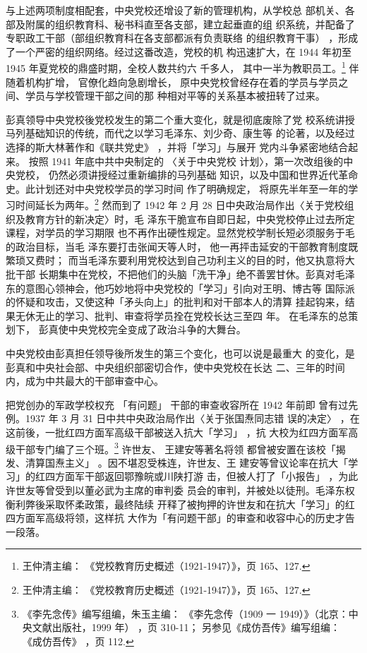 与上述两项制度相配套，中央党校还增设了新的管理机构，从学校总
部机关、各部及附属的组织教育科、秘书科直至各支部，建立起垂直的组
织系统，并配备了专职政工干部（部组织教育科在各支部都派有负责联络
的组织教育干事）
，形成了一个严密的组织网络。经过这番改造，党校的机
构迅速扩大，在 1944 年初至 1945 年夏党校的鼎盛时期，全校人数共约六
千多人，
其中一半为教职员工。\footnote{王仲清主编：
《党校教育历史概述（1921-1947）》，页 165、127.} 伴随着机构扩增，
官僚化趋向急剧增长，
原中央党校曾经存在着的学员与学员之间、学员与学校管理干部之间的那
种相对平等的关系基本被扭转了过来。

彭真领导中央党校後党校发生的第二个重大变化，就是彻底废除了党
校系统讲授马列基础知识的传统，而代之以学习毛泽东、刘少奇、康生等
的论著，以及经过选择的斯大林著作和《联共党史》
，并将「学习」与展开
党内斗争紧密地结合起来。
按照 1941 年底中共中央制定的
〈关于中央党校
计划〉，第一次改组後的中央党校，
仍然必须讲授经过重新编排的马列基础
知识，以及中国和世界近代革命史。此计划还对中央党校学员的学习时间
作了明确规定，
将原先半年至一年的学习时间延长为两年。\footnote{王仲清主编：
《党校教育历史概述（1921-1947）》，页 165、127.} 然而到了 1942
年 2 月 28 日中央政治局作出〈关于党校组织及教育方针的新决定〉时，毛
泽东干脆宣布自即日起，中央党校停止过去所定课程，对学员的学习期限
也不再作出硬性规定。显然党校学制长短必须服务于毛的政治目标，当毛
泽东要打击张闻天等人时，
他一再抨击延安的干部教育制度既繁琐又费时；
而当毛泽东要利用党校达到自己功利主义的目的时，他又执意将大批干部
长期集中在党校，不把他们的头脑「洗干净」绝不善罢甘休。彭真对毛泽
东的意图心领神会，他巧妙地将中央党校的「学习」引向对王明、博古等
国际派的怀疑和攻击，又使这种「矛头向上」的批判和对干部本人的清算
挂起钩来，结果无休无止的学习、批判、审查将学员拴在党校长达三至四
年。
在毛泽东的总策划下，
彭真使中央党校完全变成了政治斗争的大舞台。

中央党校由彭真担任领导後所发生的第三个变化，也可以说是最重大
的变化，是彭真和中央社会部、中央组织部密切合作，使中央党校在长达
二、三年的时间内，成为中共最大的干部审查中心。

把党创办的军政学校权充
「有问题」
干部的审查收容所在 1942 年前即
曾有过先例。1937 年 3 月 31 日中共中央政治局作出〈关于张国焘同志错
误的决定〉
，在这前後，一批红四方面军高级干部被送入抗大「学习」
，抗
大校为红四方面军高级干部专门编了三个班。\footnote{《李先念传》编写组编，朱玉主编：
《李先念传（1909 一 1949）》（北京：中央文献出版社，1999 年）
，页 310-11；
另参见《成仿吾传》编写组编：
《成仿吾传》
，页 112.} 许世友、
王建安等著名将领
都曾被安置在该校「揭发、清算国焘主义」
。因不堪忍受株连，许世友、王
建安等曾议论率在抗大「学习」的红四方面军干部返回鄂豫皖或川陕打游
击，但被人打了「小报告」
，为此许世友等曾受到以董必武为主席的审判委
员会的审判，并被处以徒刑。毛泽东权衡利弊後采取怀柔政策，最终陆续
开释了被拘押的许世友和在抗大「学习」的红四方面军高级将领，这样抗
大作为「有问题干部」的审查和收容中心的历史才告一段落。

